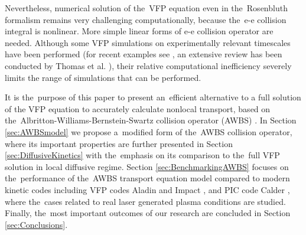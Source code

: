 
Nevertheless, numerical solution of the~VFP equation even in the~Rosenbluth
formalism remains very challenging computationally, because the~e-e collision
integral is nonlinear. More simple linear forms of e-e collision operator
are needed. Although some VFP simulations on experimentally relevant timescales 
have been performed (for recent examples see 
\cite{Hawreliak04,Ridgers08,Willingale10,Bissell10,Joglekar14,Joglekar16,Henchen_PRL2018}, 
an extensive review has been conducted by Thomas et al. \cite{Thomas13}), 
their relative computational inefficiency severely limits the range of 
simulations that can be performed.

It is the~purpose of this paper to present an~efficient alternative 
to a full solution of the VFP equation to accurately calculate 
nonlocal transport, based on the~Albritton-Williams-Bernstein-Swartz 
collision operator (AWBS) \cite{AWBS_PRL1986}.
In Section \ref{sec:AWBSmodel} we propose a~modified form of 
the~AWBS collision operator, where its important properties are further
presented in Section \ref{sec:DiffusiveKinetics} with the~emphasis on its
comparison to the~full VFP solution in local diffusive regime. 
Section \ref{sec:BenchmarkingAWBS} focuses on the~performance of the~AWBS 
transport equation model compared to modern kinetic codes including VFP codes
Aladin and Impact \cite{Kingham_JCP2004}, and PIC code Calder 
\cite{Perez_PoP2012}, where the~cases related to real
laser generated plasma conditions are studied. Finally, the~most important
outcomes of our research are concluded in Section \ref{sec:Conclusions}. 
